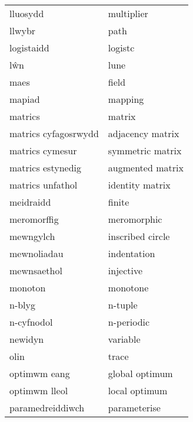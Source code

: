 \begin{supertabular}{p{0.22\textwidth}p{0.22\textwidth}}
                        lluosydd &                        multiplier \\
                          llwybr &                              path \\
                      logistaidd &                           logistc \\
                             lŵn &                              lune \\
                            maes &                             field \\
                          mapiad &                           mapping \\
                         matrics &                            matrix \\
            matrics cyfagosrwydd &                  adjacency matrix \\
                 matrics cymesur &                  symmetric matrix \\
               matrics estynedig &                  augmented matrix \\
                matrics unfathol &                   identity matrix \\
                       meidraidd &                            finite \\
                     meromorffig &                       meromorphic \\
                       mewngylch &                  inscribed circle \\
                     mewnoliadau &                       indentation \\
                     mewnsaethol &                         injective \\
                         monoton &                          monotone \\
                          n-blyg &                           n-tuple \\
                      n-cyfnodol &                        n-periodic \\
                         newidyn &                          variable \\
                            olin &                             trace \\
                    optimwm eang &                    global optimum \\
                   optimwm lleol &                     local optimum \\
                paramedreiddiwch &                      parameterise \\

\end{supertabular}
